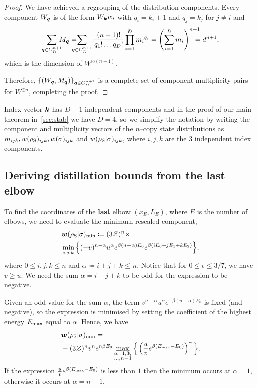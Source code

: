 \begin{proof}
We have achieved a regrouping of the distribution components.
Every component $W_{\bm{q}}$ is of the form $W_{\bm{k}} w_i$ with $q_i = k_i + 1$ and $q_j = k_j$ for $j\neq i$ and 
\begin{align*}
	\sum_{\bmq \in C_D^{n+1}}  \hspace{-6pt} M_{\bmq} =  \hspace{-10pt} \sum_{\bmq \in C_D^{n+1}} \frac{(n+1)!}{q_1!\dots q_D!} \prod\limits_{i=1}^D {m_i}^{q_i} = 
	\left( \sum_{i=1}^D m_i \right)^{n+1} \hspace{-10pt} = d^{n+1},
\end{align*}
which is the dimension of $W^{\otimes (n+1)}$.

Therefore, $\{ (W_{\bm{q}}, M_{\bm{q}}) \}_{\bm{q} \in C_D^{n+1}}$ is a complete set of component-multiplicity pairs for $W^{\otimes n}$, completing the proof.
\end{proof}

Index vector $\bm{k}$ has $D-1$ independent components and in the proof of our main theorem in~\cref{sec:stab} we have $D=4$, so we simplify the notation by writing the component and multiplicity vectors of the $n$--copy state distributions as $m_{ijk}, w(\rho_{\rm{S}})_{ijk}, w(\sigma)_{ijk}$ and $w(\rho_{\rm{S}}|\sigma)_{ijk}$, where $i,j,k$ are the 3 independent index components.	
	
\subsection{Deriving distillation bounds from the last elbow}
\label{sec:last_elb}


To find the coordinates of the \textbf{last} elbow $(x_E, L_E)$, where $E$ is the number of elbows, we need to evaluate the minimum rescaled component,
\begin{align}
	&\bm{w}(\rho_{\rm{S}} | \sigma)_{\rm{min}} \coloneqq (3\mathcal{Z})^{n}\times \nonumber\\
	&\min\limits_{i,j,k}\Big\{ (-v)^{n-\alpha} u^{\alpha} e^{\beta (n-\alpha)E_0} e^{\beta ( i E_0 + j E_1 + k E_2 )} \Big\}, \label{eq:min_slope}
\end{align}
where $0 \leq i,j,k \leq n$ and $\alpha \coloneqq i+j+k \leq n$.
Notice that for $0 \leq \epsilon \leq 3/7$, we have $v \geq u$. 
We need the sum $\alpha = i+j+k$ to be odd for the expression to be negative.

Given an odd value for the sum $\alpha$, the term $v^{n-\alpha} u^{\alpha} e^{-\beta (n-\alpha)E_0}$ is fixed (and negative), so the expression is minimised by setting the coefficient of the highest energy $E_{\rm{max}}$ equal to $\alpha$.
Hence, we have
\begin{align}
	&\bm{w}(\rho_{\rm{S}} | \sigma)_{\rm{min}} = \nonumber\\
	&-(3\mathcal{Z})^{n} v^n e^{n\beta E_0}\max\limits_{\substack{\alpha = 1,3, \\ \dots,n-1}}{\Big\{ \left( \frac{u}{v} e^{\beta (E_{\rm{max}} - E_0)} \right)^{\alpha} \Big\}}.
\end{align}
If the expression $\frac{u}{v} e^{\beta (E_{\rm{max}} - E_0)}$ is less than $1$ then the minimum occurs at $\alpha=1$, otherwise it occurs at $\alpha = n-1$.


